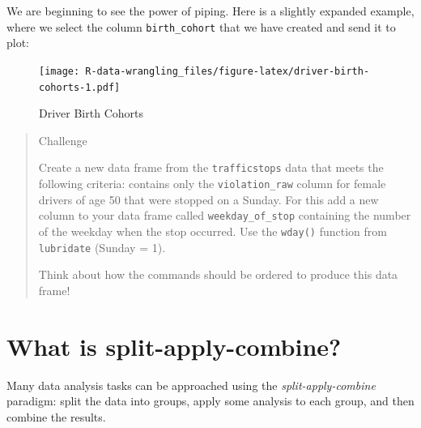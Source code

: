 \documentclass[]{book}
\newenvironment{Shaded}{\begin{snugshade}}{\end{snugshade}}
\newcommand{\KeywordTok}[1]{\textcolor[rgb]{0.13,0.29,0.53}{\textbf{#1}}}
\newcommand{\DataTypeTok}[1]{\textcolor[rgb]{0.13,0.29,0.53}{#1}}
\newcommand{\DecValTok}[1]{\textcolor[rgb]{0.00,0.00,0.81}{#1}}
\newcommand{\StringTok}[1]{\textcolor[rgb]{0.31,0.60,0.02}{#1}}
\newcommand{\OperatorTok}[1]{\textcolor[rgb]{0.81,0.36,0.00}{\textbf{#1}}}
\newcommand{\NormalTok}[1]{#1}
\theoremstyle{definition}
\theoremstyle{definition}
\theoremstyle{definition}
\theoremstyle{remark}
\begin{document}
We are beginning to see the power of piping. Here is a slightly expanded
example, where we select the column \texttt{birth\_cohort} that we have
created and send it to plot:

\begin{Shaded}
\end{Shaded}

\begin{figure}
\centering
\texttt{[image: R-data-wrangling\_files/figure-latex/driver-birth-cohorts-1.pdf]}
\caption{\label{fig:driver-birth-cohorts}Driver Birth Cohorts}
\end{figure}

\begin{quote}
Challenge

Create a new data frame from the \texttt{trafficstops} data that meets
the following criteria: contains only the \texttt{violation\_raw} column
for female drivers of age 50 that were stopped on a Sunday. For this add
a new column to your data frame called \texttt{weekday\_of\_stop}
containing the number of the weekday when the stop occurred. Use the
\texttt{wday()} function from \texttt{lubridate} (Sunday = 1).

Think about how the commands should be ordered to produce this data
frame!
\end{quote}

\section{What is
split-apply-combine?}\label{what-is-split-apply-combine}

Many data analysis tasks can be approached using the
\emph{split-apply-combine} paradigm: split the data into groups, apply
some analysis to each group, and then combine the results.
\end{document}

